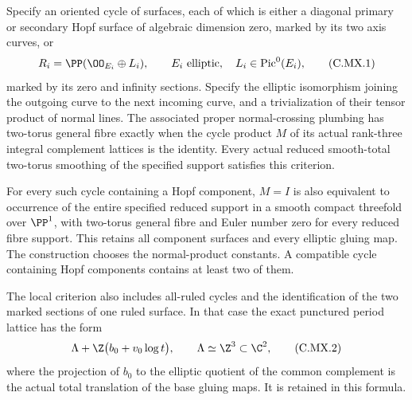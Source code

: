 \begin{proposition}\label{cdp:st:C.2.UN.51}

Specify an oriented cycle of surfaces, each of which is either
a diagonal primary or secondary Hopf surface of algebraic dimension
zero, marked by its two axis curves, or
\[
                  R_i=\PP(\OO_{E_i}\oplus L_i),
                  \qquad E_i\ \hbox{elliptic},\quad
                         L_i\in\operatorname{Pic}^0(E_i),
                                                        \tag{C.MX.1}\label{cdp:eq:C.MX.1}
\]
marked by its zero and infinity sections. Specify the elliptic
isomorphism joining the outgoing curve to the next incoming curve,
and a trivialization of their tensor product of normal lines.
The associated proper normal-crossing plumbing has two-torus
general fibre exactly when the cycle product $M$ of its actual
rank-three integral complement lattices is the identity.
Every actual reduced smooth-total two-torus smoothing of the
specified support satisfies this criterion.

For every such cycle containing a Hopf component, $M=I$ is also
equivalent to occurrence of the entire specified reduced support
in a smooth compact threefold over $\PP^1$, with two-torus
general fibre and Euler number zero for every reduced fibre
support. This retains all component surfaces and every elliptic
gluing map. The construction chooses the normal-product constants.
A compatible cycle containing Hopf components contains at least
two of them.

The local criterion also includes all-ruled cycles and the
identification of the two marked sections of one ruled surface.
In that case the exact punctured period lattice has the form
\[
                 \Lambda+\Z\bigl(b_0+v_0\log t\bigr),
           \qquad \Lambda\simeq\Z^3\subset\C^2,          \tag{C.MX.2}\label{cdp:eq:C.MX.2}
\]
where the projection of $b_0$ to the elliptic quotient of the
common complement is the actual total translation of the base
gluing maps. It is retained in this formula.
\end{proposition}

